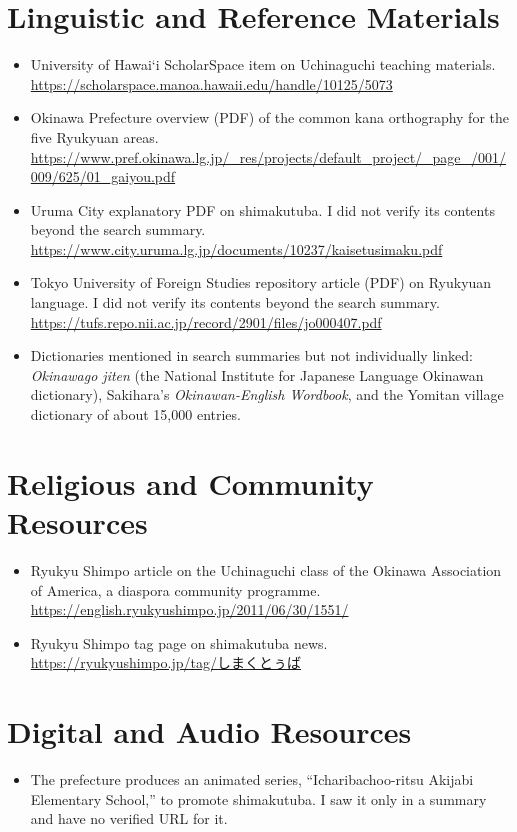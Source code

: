 \documentclass[12pt]{article}
\begin{document}
\section{Linguistic and Reference Materials}
\begin{itemize}
\item University of Hawai\textquoteleft i ScholarSpace item on Uchinaguchi teaching materials. \url{https://scholarspace.manoa.hawaii.edu/handle/10125/5073}
\item Okinawa Prefecture overview (PDF) of the common kana orthography for the five Ryukyuan areas. \url{https://www.pref.okinawa.lg.jp/_res/projects/default_project/_page_/001/009/625/01_gaiyou.pdf}
\item Uruma City explanatory PDF on shimakutuba. I did not verify its contents beyond the search summary. \url{https://www.city.uruma.lg.jp/documents/10237/kaisetusimaku.pdf}
\item Tokyo University of Foreign Studies repository article (PDF) on Ryukyuan language. I did not verify its contents beyond the search summary. \url{https://tufs.repo.nii.ac.jp/record/2901/files/jo000407.pdf}
\item Dictionaries mentioned in search summaries but not individually linked: \emph{Okinawago jiten} (the National Institute for Japanese Language Okinawan dictionary), Sakihara's \emph{Okinawan-English Wordbook}, and the Yomitan village dictionary of about 15,000 entries.
\end{itemize}

\section{Religious and Community Resources}
\begin{itemize}
\item Ryukyu Shimpo article on the Uchinaguchi class of the Okinawa Association of America, a diaspora community programme. \url{https://english.ryukyushimpo.jp/2011/06/30/1551/}
\item Ryukyu Shimpo tag page on shimakutuba news. \url{https://ryukyushimpo.jp/tag/しまくとぅば}
\end{itemize}

\section{Digital and Audio Resources}
\begin{itemize}
\item The prefecture produces an animated series, ``Icharibachoo-ritsu Akijabi Elementary School,'' to promote shimakutuba. I saw it only in a summary and have no verified URL for it.
\end{itemize}
\end{document}
